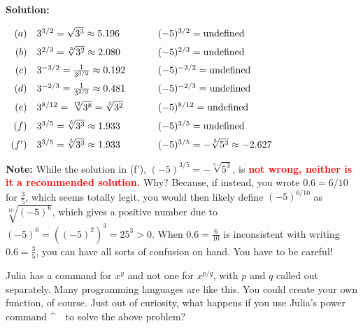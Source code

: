 \textbf{Solution:}

$
\begin{array}{rlcl}
(a) & 3^{3/2} = \sqrt{3^3} \approx 5.196   & ~~~~&  (-5)^{3/2} = \text{undefined} \medskip \\
(b) & 3^{2/3}  = \sqrt[3]{3^2} \approx 2.080   & ~~~~&    (-5)^{2/3} = \text{undefined}  \medskip \\
(c) & 3^{-3/2} = \frac{1}{3^{3/2}}\approx 0.192 & ~~~~&     (-5)^{-3/2}  = \text{undefined}  \medskip \\
(d) & 3^{-2/3} = \frac{1}{3^{2/3}}\approx 0.481 & ~~~~&  (-5)^{-2/3} = \text{undefined} \medskip \\
(e) & 3^{8/12} = \sqrt[12]{3^8} = \sqrt[3]{3^2} & ~~~~&   (-5)^{8/12}= \text{undefined}  \medskip \\
(f) & 3^{3/5} =\sqrt[5]{3^3} \approx 1.933  & ~~~~&   (-5)^{3/5}= \text{undefined}  \medskip \\
(f') & 3^{3/5} =\sqrt[5]{3^3} \approx 1.933  & ~~~~&   (-5)^{3/5}= -\sqrt[5]{5^3} \approx  - 2.627\\
\end{array}    
$ 
\bigskip

\textbf{Note:} While the solution in (f'), $(-5)^{3/5}= -\sqrt[5]{5^3} $, is \textcolor{red}{\bf not wrong, neither is it a recommended solution.} Why? Because, if instead, you wrote $0.6 = 6/10$ for $\frac{3}{5}$, which seems totally legit, you would then likely define $(-5)^{6/10}$ as $\sqrt[10]{(-5)^{6}}$, which gives a positive number due to $(-5)^6 =\left((-5)^2\right)^3= 25^3>0$. When $0.6 = \frac{6}{10}$ is inconsistent with writing $0.6 = \frac{3}{5}$, you can have all sorts of confusion on hand. You have to be careful!  \Qed

\bigskip

Julia has a command for $x^y$ and not one for $x^{p/q}$, with $p$ and $q$ called out separately. Many programming languages are like this. You could create your own function, of course. Just out of curiosity, what happens if you use Julia's power command \textasciicircum ~~to solve the above problem? 

